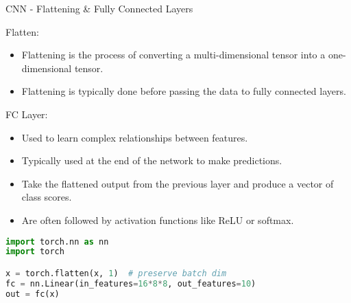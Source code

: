 \begin{frame}[fragile]{CNN - Flattening & Fully Connected Layers}
\begin{block}{Flatten:}
    \begin{itemize}
        \item Flattening is the process of converting a multi-dimensional tensor into a one-dimensional tensor.
        \item Flattening is typically done before passing the data to fully connected layers.
    \end{itemize}
\end{block}

\begin{block}{FC Layer:}
    \begin{itemize}
        \item Used to learn complex relationships between features.
        \item Typically used at the end of the network to make predictions.
        \item Take the flattened output from the previous layer and produce a vector of class scores.
        \item Are often followed by activation functions like ReLU or softmax.
    \end{itemize}
\end{block}

\begin{lstlisting}[language=Python, caption={Code snippet (PyTorch)}, basicstyle=\ttfamily\footnotesize]
import torch.nn as nn
import torch

x = torch.flatten(x, 1)  # preserve batch dim
fc = nn.Linear(in_features=16*8*8, out_features=10)
out = fc(x)
\end{lstlisting}
\end{frame}  
